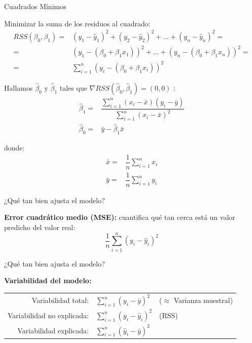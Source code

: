 \documentclass[aspectratio=169, usenames,dvipsnames]{beamer}
\begin{document}
\begin{frame}
    \Large
    Cuadrados Mínimos
    \vspace{1em}

    \pause
    \normalsize
    Minimizar la suma de los residuos al cuadrado:
    \[
    \begin{array}{rl}
       RSS(\beta_0, \beta_1) =  & (y_1-\hat{y}_1)^2 + (y_2-\hat{y}_2)^2 + \dots + (y_n-\hat{y}_n)^2 = \\
         = & (y_1 - (\beta_0+\beta_1x_1))^2 + \dots + (y_n - (\beta_0+\beta_1x_n))^2 = \\
         = & \displaystyle\sum_{i=1}^n (y_i - (\beta_0+\beta_1x_i))^2
         
    \end{array}
    \]
\end{frame}

\begin{frame}
     Hallamos $\hat{\beta}_0$ y $\hat{\beta}_1$ tales que $\nabla RSS (\hat{\beta}_0, \hat{\beta}_1) = (0, 0)$ :
     \[
     \begin{array}{rl}
          \hat{\beta}_1 = & \dfrac{\displaystyle\sum_{i=1}^n(x_i - \bar{x})(y_i - \bar{y})}{\displaystyle\sum_{i=1}^n(x_i - \bar{x})^2}  \\[1em]
          \hat{\beta}_0 = & \bar{y} - \hat{\beta}_1\bar{x}
     \end{array}
     \]

     donde:
     \[
     \begin{array}{rl}
          \bar{x} =& \dfrac{1}{n} \displaystyle\sum_{i=1}^n x_i  \\
          \bar{y} =& \dfrac{1}{n} \displaystyle\sum_{i=1}^n y_i
     \end{array}
     \]
\end{frame}

\begin{frame}
    \Large
    ¿Qué tan bien ajusta el modelo?
    \vspace{1em}

    \normalsize
    \textbf{Error cuadrático medio (MSE):} cuantifica qué tan cerca está un valor predicho del valor real:
    \[\dfrac{1}{n}\sum_{i=1}^n (y_i - \hat{y}_i)^2\]
\end{frame}

\begin{frame}
    \Large
    ¿Qué tan bien ajusta el modelo?
    \vspace{1em}

    \normalsize
    \textbf{Variabilidad del modelo:} 
    \begin{center}
    \begin{tabular}{rll}
        Variabilidad total: & $\sum_{i=1}^n (y_i - \bar{y})^2$ & {\color{black!50!white}($\approx$ Varianza muestral)}\\
        Variabilidad no explicada: & $\sum_{i=1}^n (y_i - \hat{y}_i)^2$ & {\color{black!50!white} (RSS)}\\
        Variabilidad explicada: & $\sum_{i=1}^n (\hat{y}_i - \bar{y})^2$ &
    \end{tabular}
    \end{center} 
    
\end{frame}
\end{document}
